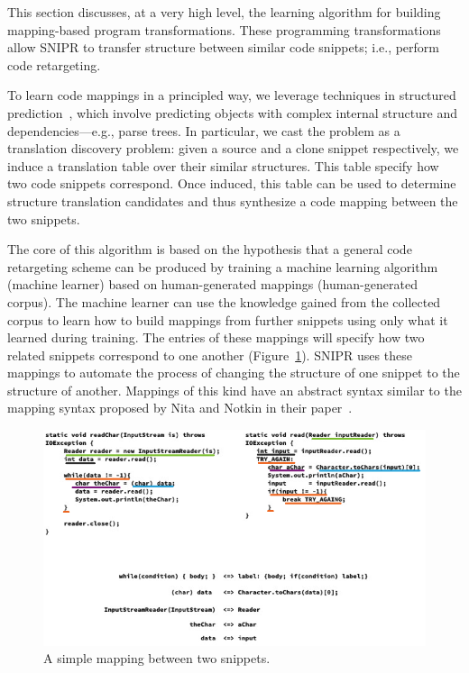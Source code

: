 This section discusses, at a very high level, the learning algorithm for building mapping-based program transformations. These programming transformations allow \uppercase{SnipR} to transfer structure between similar code snippets; i.e., perform code retargeting. 

To learn code mappings in a principled way, we leverage techniques in structured prediction~\cite{Collins:2002uo}, which involve predicting objects with complex internal structure and dependencies---e.g., parse trees. In particular, we cast the problem as a translation discovery problem: given a source and a clone snippet respectively, we induce a translation table over their similar structures. This table specify how two code snippets correspond. Once induced, this table can be used to determine structure translation candidates and thus synthesize a code mapping between the two snippets. 

The core of this algorithm is based on the hypothesis that a general code retargeting scheme can be produced by training a machine learning algorithm (machine learner) based on human-generated mappings (human-generated corpus). The machine learner can use the knowledge gained from the collected corpus to learn how to build mappings from further snippets using only what it learned during training. The entries of these mappings will specify how two related snippets correspond to one another (Figure~\ref{fig:mappings}). SNIPR uses these mappings to automate the process of changing the structure of one snippet to the structure of another. Mappings of this kind have an abstract syntax similar to the mapping syntax proposed by Nita and Notkin in their paper~\cite{Nita:2010en}.

\begin{figure}[!ht]
    \centering
    \includegraphics[width=\textwidth]{images/mappings}
    \caption{A simple mapping between two snippets.}
    \label{fig:mappings}
\end{figure}

